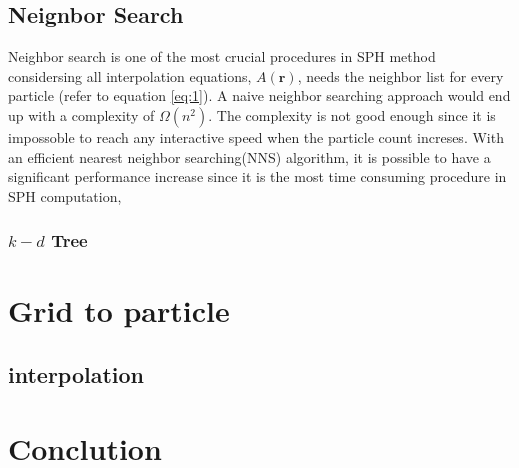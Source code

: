     \subsection{Neignbor Search}
    Neighbor search is one of the most crucial procedures in SPH method considersing all interpolation equations, $A(\textbf{r})$, needs the neighbor list for every particle (refer to equation \ref{eq:1}). A naive neighbor searching approach would end up with a complexity of $\Omega(n^2)$. The complexity is not good enough since it is impossoble to reach any interactive speed when the particle count increses. With an efficient nearest neighbor searching(NNS) algorithm, it is possible to have a significant performance increase since it is the most time consuming procedure in SPH computation,

        \subsubsection{$k-d$ Tree}



\section{Grid to particle}
    \subsection{interpolation}

\section{Conclution}